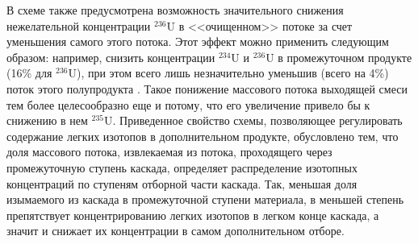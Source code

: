 В схеме также предусмотрена возможность значительного снижения нежелательной концентрации $^{236}$U в <<очищенном>> потоке за счет уменьшения самого этого потока.
Этот эффект можно применить следующим образом: например, снизить концентрации $^{234}$U и  $^{236}$U в промежуточном продукте (16\% для  $^{236}$U), при этом всего лишь незначительно уменьшив (всего на 4\%) поток этого полупродукта \cite{palkinPurificationReprocessedUranium2016}. Такое понижение массового потока выходящей смеси тем более целесообразно еще и потому, что его увеличение привело бы к снижению в нем $^{235}$U. Приведенное свойство схемы, позволяющее регулировать содержание легких изотопов в дополнительном продукте, обусловлено тем, что доля массового потока, извлекаемая из потока, проходящего через промежуточную ступень каскада, определяет распределение изотопных концентраций по ступеням отборной части каскада. Так, меньшая доля изымаемого из каскада в промежуточной ступени материала, в меньшей степень препятствует концентрированию легких изотопов в легком конце каскада, а значит и снижает их концентрации в самом дополнительном отборе.






